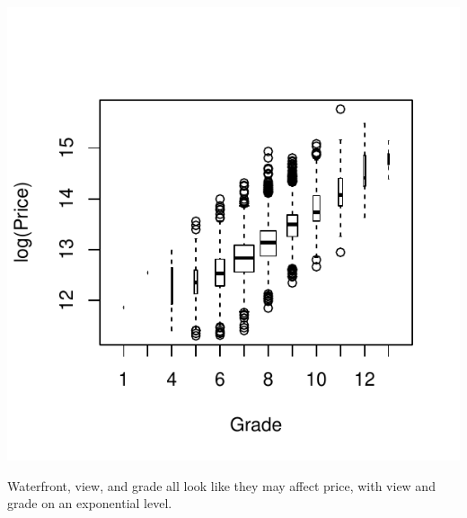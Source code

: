 \documentclass{article}\usepackage[]{graphicx}\usepackage[]{color}
\makeatletter
\def\maxwidth{ %
  \ifdim\Gin@nat@width>\linewidth
    \linewidth
  \else
    \Gin@nat@width
  \fi
}
\newenvironment{kframe}{%
 \def\at@end@of@kframe{}%
 \ifinner\ifhmode%
  \def\at@end@of@kframe{\end{minipage}}%
  \begin{minipage}{\columnwidth}%
 \fi\fi%
 \def\FrameCommand##1{\hskip\@totalleftmargin \hskip-\fboxsep
 \colorbox{shadecolor}{##1}\hskip-\fboxsep
     \hskip-\linewidth \hskip-\@totalleftmargin \hskip\columnwidth}%
 \MakeFramed {\advance\hsize-\width
   \@totalleftmargin\z@ \linewidth\hsize
   \@setminipage}}%
 {\par\unskip\endMakeFramed%
 \at@end@of@kframe}
\newenvironment{knitrout}{}{} %
\makeatother
\begin{document}
\begin{enumerate}
\begin{enumerate}
\begin{knitrout}
\includegraphics[width=\maxwidth]{figure/discrete-5} 

\end{knitrout}


Waterfront, view, and grade all look like they may affect price, with view and grade on an exponential level. 

\begin{knitrout}
\color{fgcolor}\begin{kframe}


{\ttfamily\noindent\itshape\color{messagecolor}{\#\# Loading required package: stringr}}\end{kframe}
\end{knitrout}


\end{enumerate}
\end{enumerate}
\end{document}
